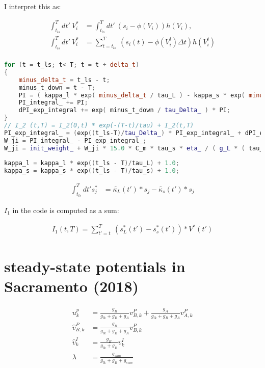 I interpret this as:


\begin{align*}
  \int_{t_{ls}}^T dt' \ V_i^* & = \int_{t_{ls}}^T dt' \  (s_i - \phi(V_i )) h(V_i),               \\
  \int_{t_{ls}}^T dt' \ V_i^* & = \sum_{t=t_{ls}}^T \  (s_i(t) -  \phi(V_i^t ) \Delta t) h(V_i^t) \\
\end{align*}

\begin{lstlisting}[language=C++, directivestyle={\color{black}}
                   emph={int,char,double,float,unsigned,exp},
                   emphstyle={\color{blue}}]
for (t = t_ls; t< T; t = t + delta_t)
{
   	minus_delta_t = t_ls - t;
    minus_t_down = t - T;
    PI = ( kappa_l * exp( minus_delta_t / tau_L ) - kappa_s * exp( minus_delta_t / tau_s ) ) * V_star(t);
    PI_integral_ += PI;
    dPI_exp_integral += exp( minus_t_down / tau_Delta_ ) * PI;
}  
// I_2 (t,T) = I_2(0,t) * exp(-(T-t)/tau) + I_2(t,T)
PI_exp_integral_ = (exp((t_ls-T)/tau_Delta_) * PI_exp_integral_ + dPI_exp_integral);
W_ji = PI_integral_ - PI_exp_integral_;
W_ji = init_weight_ + W_ji * 15.0 * C_m * tau_s * eta_ / ( g_L * ( tau_L - tau_s ) );    
  
kappa_l = kappa_l * exp((t_ls - T)/tau_L) + 1.0;
kappa_s = kappa_s * exp((t_ls - T)/tau_s) + 1.0;
  \end{lstlisting}


\begin{align*}
  \int_{t_{ls}}^T dt' s_j^* & =  \tilde{\kappa_L}(t') * s_j -  \tilde{\kappa_s}(t') * s_j
\end{align*}

$I_1$ in the code is computed as a sum:

\begin{align}
  I_1 (t,T) = \sum_{t'=t}^T \ (s_L^*(t') - s_s^*(t')) * V^*(t')
\end{align}


\section{steady-state potentials in Sacramento (2018)}

\begin{align*}
  u_k^p           & = \frac{g_B}{g_{lk} + g_B + g_A} v^P_{B,k} + \frac{g_A}{g_{lk} + g_B + g_A} v^P_{A,k} \\
  \hat{v}^P_{B,k} & = \frac{g_B}{g_{lk} + g_B + g_A} v^P_{B,k}                                            \\
  \hat{v}^I_{k}   & = \frac{g_B}{g_{lk} + g_B} v^I_{k}                                                    \\
  \lambda         & = \frac{g_{som}}{g_{lk} + g_B + g_{som}}
\end{align*}


